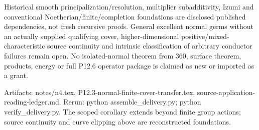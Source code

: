 Historical smooth principalization/resolution, multiplier subadditivity,
Izumi and conventional Noetherian/finite/completion foundations are
disclosed published dependencies, not fresh recursive proofs. General
excellent normal germs without an actually supplied qualifying cover,
higher-dimensional positive/mixed-characteristic source continuity and
intrinsic classification of arbitrary conductor failures remain open.
No isolated-normal theorem from 360, surface theorem, products, energy
or full P12.6 operator package is claimed as new or imported as a grant.

Artifacts: notes/n4.tex, P12.3-normal-finite-cover-transfer.tex,
source-application-reading-ledger.md. Rerun:
python assemble\_delivery.py; python verify\_delivery.py.
The scoped corollary extends beyond finite group actions; source
continuity and curve clipping above are reconstructed foundations.
